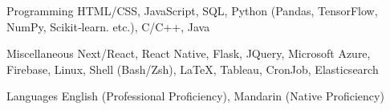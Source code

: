 

\begin{cvskills}

  \cvskill
    {Programming} %
    {HTML/CSS, JavaScript, SQL, Python (Pandas, TensorFlow, NumPy, Scikit‑learn. etc.),  C/C++, Java} %

  \cvskill
    {Miscellaneous} %
    {Next/React, React Native, Flask, JQuery, Microsoft Azure, Firebase, Linux, Shell (Bash/Zsh), \LaTeX, Tableau, CronJob, Elasticsearch} %
    
  \cvskill
    {Languages} %
    {English (Professional Proficiency), Mandarin (Native Proficiency)} %

\end{cvskills}
